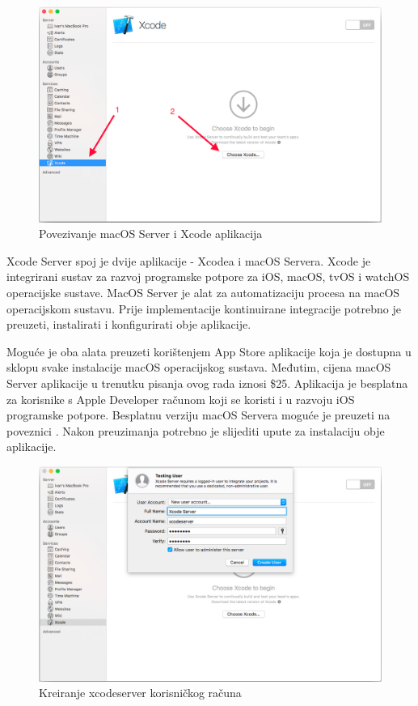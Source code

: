 \documentclass[times, utf8, diplomski, numeric]{fer}
\begin{document}
\begin{figure}
\centering
\includegraphics[scale=0.35]{XcodeServerSetup1}
\caption{Povezivanje macOS Server i Xcode aplikacija}
\label{fig:XcodeServerSetup1}
\end{figure}

Xcode Server spoj je dvije aplikacije - Xcodea i macOS Servera. Xcode je integrirani sustav za razvoj programske potpore za iOS, macOS, tvOS i watchOS operacijske sustave. MacOS Server je alat za automatizaciju procesa na macOS operacijskom sustavu. Prije implementacije kontinuirane integracije potrebno je preuzeti, instalirati i konfigurirati obje aplikacije.

Moguće je oba alata preuzeti korištenjem App Store aplikacije koja je dostupna u sklopu svake instalacije macOS operacijskog sustava. Međutim, cijena macOS Server aplikacije u trenutku pisanja ovog rada iznosi \$25. Aplikacija je besplatna za korisnike s Apple Developer računom koji se koristi i u razvoju iOS programske potpore. Besplatnu verziju macOS Servera moguće je preuzeti na poveznici . Nakon preuzimanja potrebno je slijediti upute za instalaciju obje aplikacije.

\begin{figure}
\centering
\includegraphics[scale=0.35]{XcodeServerSetup2}
\caption{Kreiranje xcodeserver korisničkog računa}
\label{fig:XcodeServerSetup2}
\end{figure}
\end{document}
